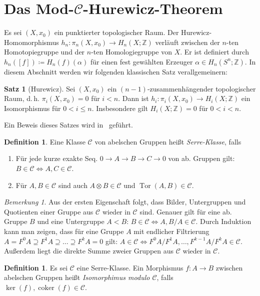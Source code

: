 \documentclass[11pt, a4paper, german]{article}
\theoremstyle{definition}
\newtheorem{satz}[lem]{Satz}
\newtheorem{defn}[lem]{Definition}
\theoremstyle{remark}
\newtheorem*{bem}{Bemerkung}
\newcommand{\Z}{\mathbb{Z}} %
\DeclareMathOperator{\coker}{coker} %
\DeclareMathOperator{\Tor}{Tor} %
\newcommand{\SC}{\mathcal{C}} %
\renewcommand{\dh}{d.\,h.} %
\begin{document}
\section{Das Mod-$\SC$-Hurewicz-Theorem}

Es sei $(X, x_0)$ ein punktierter topologischer Raum.
Der Hurewicz-Homomorphismus $h_n : \pi_n(X, x_0) \to H_n(X; \Z)$ verläuft zwischen der $n$-ten Homotopiegruppe und der $n$-ten Homologiegruppe von $X$.
Er ist definiert durch $h_n([f]) \coloneqq H_n(f)(\alpha)$ für einen fest gewählten Erzeuger $\alpha \in H_n(S^n; \Z)$.
In diesem Abschnitt werden wir folgenden klassischen Satz verallgemeinern:

\begin{satz}[Hurewicz]
  Sei $(X, x_0)$ ein $(n{-}1)$-zusammenhängender topologischer Raum, \dh{} $\pi_i(X, x_0) = 0$ für $i < n$.
  Dann ist $h_i : \pi_i(X, x_0) \to H_i(X; \Z)$ ein Isomorphismus für $0 < i \leq n$.
  Insbesondere gilt $H_i(X; \Z) = 0$ für $0 < i < n$.
\end{satz}

Ein Beweis dieses Satzes wird in~\cite[\mbox{}4.32]{hatcher:at} geführt.

\begin{defn}\label{serre-class}
  Eine Klasse $\SC$ von abelschen Gruppen heißt \emph{Serre-Klasse}, falls
  \begin{enumerate}[label=(\Roman*)]
    \item Für jede kurze exakte Seq. $0 \to A \to B \to C \to 0$ von ab. Gruppen gilt: $B \in \SC \Leftrightarrow A, C \in \SC$.
    \item Für $A, B \in \SC$ sind auch $A \otimes B \in \SC$ und $\Tor(A, B) \in \SC$.
  \end{enumerate}
\end{defn}

\begin{bem}
  Aus der ersten Eigenschaft folgt, dass Bilder, Untergruppen und Quotienten einer Gruppe aus $\SC$ wieder in $\SC$ sind.
  Genauer gilt für eine ab. Gruppe $B$ und eine Untergruppe $A < B$: $B \in \SC \iff A, B/A \in \SC$.
  Durch Induktion kann man zeigen, dass für eine Gruppe $A$ mit endlicher Filtrierung
  $A = F^0 A \supseteq F^1 A \supseteq \ldots \supseteq F^k A = 0$
  gilt: $A \in \SC \iff F^0 A / F^1 A, \ldots, F^{k-1} A / F^k A \in \SC$.
  Außerdem liegt die direkte Summe zweier Gruppen aus $\SC$ wieder in $\SC$.
\end{bem}

\begin{defn}
  Es sei $\SC$ eine Serre-Klasse.
  Ein Morphismus $f : A \to B$ zwischen abelschen Gruppen heißt \emph{Isomorphimus modulo $\SC$}, falls $\ker(f), \coker(f) \in \SC$. \\
\end{defn}
\end{document}
